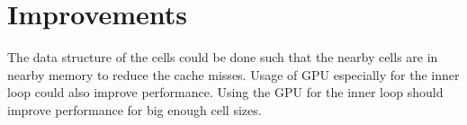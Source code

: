 \section{Improvements}
The data structure of the cells could be done such that the nearby cells are in nearby memory to reduce the cache misses. Usage of GPU especially for the inner loop could also improve performance. Using the GPU for the inner loop should improve performance for big enough cell sizes.
